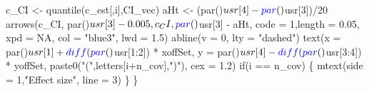 \documentclass[11pt,]{article}
\newenvironment{Shaded}{}{}
\newcommand{\ControlFlowTok}[1]{\textcolor[rgb]{0.00,0.00,1.00}{#1}}
\newcommand{\DataTypeTok}[1]{#1}
\newcommand{\DecValTok}[1]{#1}
\newcommand{\FloatTok}[1]{#1}
\newcommand{\KeywordTok}[1]{\textcolor[rgb]{0.00,0.00,1.00}{#1}}
\newcommand{\NormalTok}[1]{#1}
\newcommand{\OperatorTok}[1]{#1}
\newcommand{\OtherTok}[1]{\textcolor[rgb]{1.00,0.25,0.00}{#1}}
\newcommand{\StringTok}[1]{\textcolor[rgb]{0.00,0.50,0.50}{#1}}
\begin{document}
\begin{Shaded}
\begin{Highlighting}[]
\NormalTok{  c_CI <-}\StringTok{ }\KeywordTok{quantile}\NormalTok{(c_est[,i],CI_vec)}
\NormalTok{  aHt <-}\StringTok{ }\NormalTok{(}\KeywordTok{par}\NormalTok{()}\OperatorTok{$}\NormalTok{usr[}\DecValTok{4}\NormalTok{]}\OperatorTok{-}\KeywordTok{par}\NormalTok{()}\OperatorTok{$}\NormalTok{usr[}\DecValTok{3}\NormalTok{])}\OperatorTok{/}\DecValTok{20}
  \KeywordTok{arrows}\NormalTok{(c_CI, }\KeywordTok{par}\NormalTok{()}\OperatorTok{$}\NormalTok{usr[}\DecValTok{3}\NormalTok{]}\OperatorTok{-}\FloatTok{0.005}\NormalTok{, c_CI, }\KeywordTok{par}\NormalTok{()}\OperatorTok{$}\NormalTok{usr[}\DecValTok{3}\NormalTok{] }\OperatorTok{-}\StringTok{ }\NormalTok{aHt,}
         \DataTypeTok{code =} \DecValTok{1}\NormalTok{,}\DataTypeTok{length =} \FloatTok{0.05}\NormalTok{, }\DataTypeTok{xpd =} \OtherTok{NA}\NormalTok{, }\DataTypeTok{col =} \StringTok{"blue3"}\NormalTok{, }\DataTypeTok{lwd =} \FloatTok{1.5}\NormalTok{)}
  \KeywordTok{abline}\NormalTok{(}\DataTypeTok{v =} \DecValTok{0}\NormalTok{, }\DataTypeTok{lty =} \StringTok{"dashed"}\NormalTok{)}
  \KeywordTok{text}\NormalTok{(}\DataTypeTok{x =} \KeywordTok{par}\NormalTok{()}\OperatorTok{$}\NormalTok{usr[}\DecValTok{1}\NormalTok{] }\OperatorTok{+}\StringTok{ }\KeywordTok{diff}\NormalTok{(}\KeywordTok{par}\NormalTok{()}\OperatorTok{$}\NormalTok{usr[}\DecValTok{1}\OperatorTok{:}\DecValTok{2}\NormalTok{]) }\OperatorTok{*}\StringTok{ }\NormalTok{xoffSet,}
       \DataTypeTok{y =} \KeywordTok{par}\NormalTok{()}\OperatorTok{$}\NormalTok{usr[}\DecValTok{4}\NormalTok{] }\OperatorTok{-}\StringTok{ }\KeywordTok{diff}\NormalTok{(}\KeywordTok{par}\NormalTok{()}\OperatorTok{$}\NormalTok{usr[}\DecValTok{3}\OperatorTok{:}\DecValTok{4}\NormalTok{]) }\OperatorTok{*}\StringTok{ }\NormalTok{yoffSet,}
       \KeywordTok{paste0}\NormalTok{(}\StringTok{"("}\NormalTok{,letters[i}\OperatorTok{+}\NormalTok{n_cov],}\StringTok{")"}\NormalTok{),}
       \DataTypeTok{cex =} \FloatTok{1.2}\NormalTok{)}
  \ControlFlowTok{if}\NormalTok{(i }\OperatorTok{==}\StringTok{ }\NormalTok{n_cov) \{ }\KeywordTok{mtext}\NormalTok{(}\DataTypeTok{side =} \DecValTok{1}\NormalTok{,}\StringTok{"Effect size"}\NormalTok{, }\DataTypeTok{line =} \DecValTok{3}\NormalTok{) \}}
\NormalTok{\}}
\end{Highlighting}
\end{Shaded}
\end{document}
